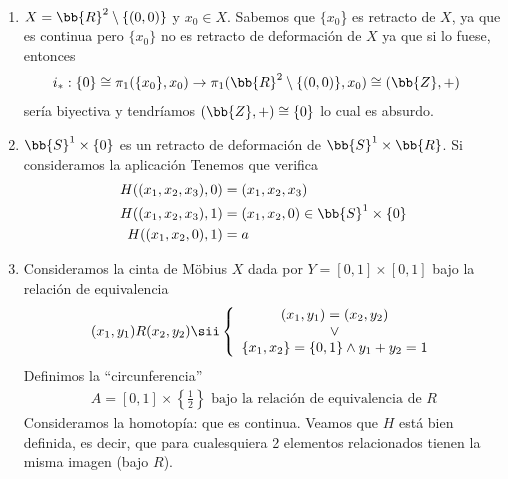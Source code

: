 \begin{ejemplo}\
    \begin{enumerate}
        \item $X=\bb{R}^2\setminus \{(0,0)\}$ y $x_0\in X$. Sabemos que $\{x_0$\} es retracto de $X$, ya que
        \Func{r}{X}{\{x_0\}}{x}{x_0}
        es continua pero $\{x_0\}$ no es retracto de deformación de $X$ ya que si lo fuese, entonces
        \begin{align*}
            i_*: \{0\} \cong \pi_1(\{x_0\},x_0) &\to \pi_1(\bb{R}^2\setminus\{(0,0)\}, x_0) \cong (\bb{Z}, +)
        \end{align*}
        sería biyectiva y tendríamos $(\bb{Z}, +) \cong \{0\}$ lo cual es absurdo.

        \item $\bb{S}^1 \times \{0\}$ es un retracto de deformación de $\bb{S}^1 \times \bb{R}$. Si consideramos la aplicación
        Tenemos que verifica 
        \begin{align*}
            H((x_1,x_2,x_3),0) &= (x_1,x_2,x_3)\\
            H((x_1,x_2,x_3),1) &= (x_1,x_2,0)\in \bb{S}^1\times \{0\}\\
            H((x_1,x_2,0),1) &= a
        \end{align*}

        \item Consideramos la cinta de Möbius $X$ dada por $Y=[0,1]\times [0,1]$ bajo la relación de equivalencia
        \begin{gather*}
            (x_1,y_1)R(x_2,y_2) \sii \left\{
                \begin{array}{c}
                    (x_1,y_1) = (x_2,y_2)\\
                    \vee\\ 
                    \{x_1,x_2\} = \{0,1\} \wedge y_1+y_2=1
                \end{array}
            \right.
        \end{gather*}
        Definimos la ``circunferencia''
        \begin{gather*}
            A = [0,1]\times \left\{ \frac{1}{2} \right\} \text{ bajo la relación de equivalencia de }R
        \end{gather*}
        Consideramos la homotopía:
        que es continua. Veamos que $H$ está bien definida, es decir, que para cualesquiera 2 elementos relacionados tienen la misma imagen (bajo $R$).\\
        

\end{enumerate}
\end{ejemplo}
